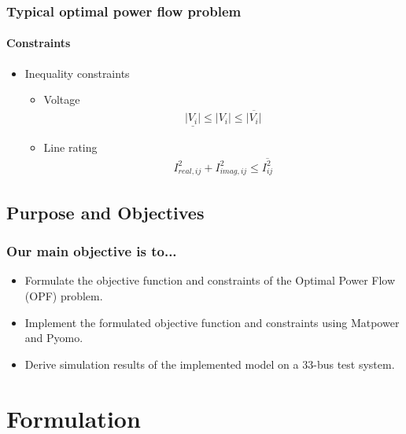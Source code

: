 \documentclass[
	11pt, %
	aspectratio=169, %
]{beamer}
\begin{document}
\begin{frame}
	\frametitle{Typical optimal power flow problem}
	\framesubtitle{Constraints} %
	
	\begin{itemize}
	\item Inequality constraints
		\begin{itemize}
			\item Voltage
				\begin{align*}
					\underline{\left| V_{i} \right|} \leq \left| V_{i} \right| \leq \overline{\left| V_{i} \right|}
				\end{align*}

			\item Line rating
				\begin{align*}
					I^{2}_{real,ij}+I^{2}_{imag,ij} \leq \overline{I^{2}_{ij}}
				\end{align*}
		\end{itemize}

	\end{itemize}
	
	
\end{frame}


\subsection{Purpose and Objectives}

\begin{frame}
	\frametitle{Our main objective is to...}
	
	\begin{itemize}
		\item Formulate the objective function and constraints of the Optimal Power Flow (OPF) problem.
		\item Implement the formulated objective function and constraints using Matpower and Pyomo.
		\item Derive simulation results of the implemented model on a 33-bus test system.
	\end{itemize}
	
	
\end{frame}


\section{Formulation}
\end{document}
